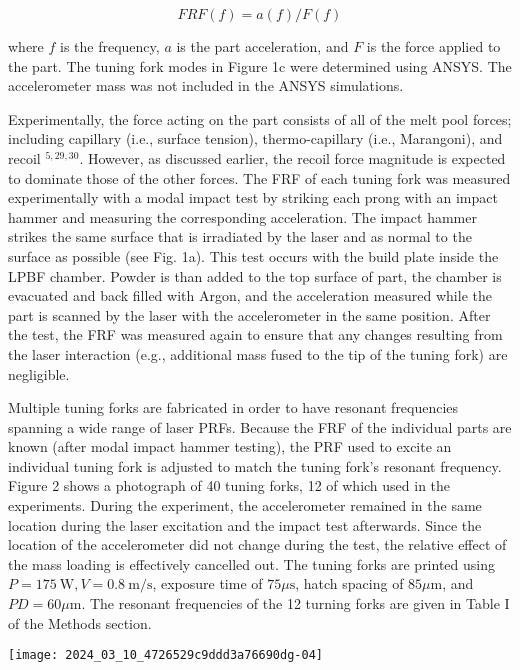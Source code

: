 \documentclass[10pt]{article}
\begin{document}
\begin{equation*}
F R F(f)=a(f) / F(f) \tag{1}
\end{equation*}


where $f$ is the frequency, $a$ is the part acceleration, and $F$ is the force applied to the part. The tuning fork modes in Figure 1c were determined using ANSYS. The accelerometer mass was not included in the ANSYS simulations.

Experimentally, the force acting on the part consists of all of the melt pool forces; including capillary (i.e., surface tension), thermo-capillary (i.e., Marangoni), and recoil ${ }^{5,29,30}$. However, as discussed earlier, the recoil force magnitude is expected to dominate those of the other forces. The FRF of each tuning fork was measured experimentally with a modal impact test by striking each prong with an impact hammer and measuring the corresponding acceleration. The impact hammer strikes the same surface that is irradiated by the laser and as normal to the surface as possible (see Fig. 1a). This test occurs with the build plate inside the LPBF chamber. Powder is than added to the top surface of part, the chamber is evacuated and back filled with Argon, and the acceleration measured while the part is scanned by the laser with the accelerometer in the same position. After the test, the FRF was measured again to ensure that any changes resulting from the laser interaction (e.g., additional mass fused to the tip of the tuning fork) are negligible.

Multiple tuning forks are fabricated in order to have resonant frequencies spanning a wide range of laser PRFs. Because the FRF of the individual parts are known (after modal impact hammer testing), the PRF used to excite an individual tuning fork is adjusted to match the tuning fork's resonant frequency. Figure 2 shows a photograph of 40 tuning forks, 12 of which used in the experiments. During the experiment, the accelerometer remained in the same location during the laser excitation and the impact test afterwards. Since the location of the accelerometer did not change during the test, the relative effect of the mass loading is effectively cancelled out. The tuning forks are printed using $P=175 \mathrm{~W}, V=0.8 \mathrm{~m} / \mathrm{s}$, exposure time of $75 \mu \mathrm{s}$, hatch spacing of $85 \mu \mathrm{m}$, and $P D=60 \mu \mathrm{m}$. The resonant frequencies of the 12 turning forks are given in Table I of the Methods section.

\begin{center}
\texttt{[image: 2024\_03\_10\_4726529c9ddd3a76690dg-04]}
\end{center}
\end{document}
